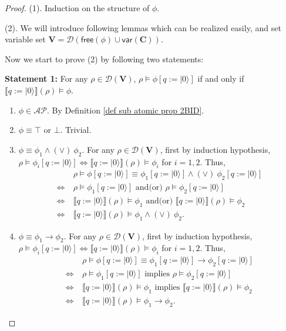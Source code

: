 \documentclass[conference,compsoc, 10pt]{IEEEtran}
\newcommand {\qI} {{q:=|0\rangle}}
\newcommand {\cD } {{\mathcal{D}}}
\newcommand {\free }[1] {{\mathsf{free}\left(#1\right)}}
\newcommand {\vars } {\mathbf{V}}
\newcommand {\var } {\mathsf{var}}
\newcommand {\prog } {{\mathbf{C}}}
\newcommand {\sem}[1] {\llbracket#1\rrbracket}
\newcommand {\AP} {{\mathcal{AP}}}
\begin{document}
\begin{appendices}
\begin{proof}
			\noindent (1). Induction on the structure of $\phi$.
			
			\vspace{0.2cm}
			
			\noindent (2). 	We will introduce following lemmas which can be realized easily, and set variable set $\vars = \cD(\free{\phi}\cup\var(\prog))$.	
			
			Now we start to prove (2) by following two statements:
			
			{\bf Statement 1:} For any $\rho\in\cD(\vars)$, $\rho\models\phi[\qI]$ if and only if $\sem{\qI}(\rho)\models\phi$.
			\begin{enumerate}
				\item $\phi\in\AP$. By Definition \ref{def sub atomic prop 2BID}.
				
				\item $\phi \equiv \top$ or $\bot$. Trivial.
				
				\item $\phi \equiv \phi_1\wedge\!(\vee)\ \phi_2$. For any $\rho\in\cD(\vars)$, first by induction hypothesis, $\rho\models\phi_i[\qI]\Leftrightarrow\sem{\qI}(\rho)\models\phi_i$ for $i = 1,2$. Thus, 
				\begin{align*}
				&\rho\models\phi[\qI] \equiv \phi_1[\qI]\wedge\!(\vee)\ \phi_2[\qI] \\
				\Longleftrightarrow\ &\rho\models\phi_1[\qI] \text{\ and(or)\ }\rho\models\phi_2[\qI] \\
				\Longleftrightarrow\ &\sem{\qI}(\rho)\models\phi_1 \text{\ and(or)\ }\sem{\qI}(\rho)\models\phi_2 \\
				\Longleftrightarrow\ &\sem{\qI}(\rho)\models\phi_1\wedge\!(\vee)\ \phi_2.
				\end{align*}
				
				\item $\phi \equiv \phi_1\rightarrow\phi_2$. For any $\rho\in\cD(\vars)$, first by induction hypothesis, $\rho\models\phi_i[\qI]\Leftrightarrow\sem{\qI}(\rho)\models\phi_i$ for $i = 1,2$. Thus, 
				\begin{align*}
				&\rho\models\phi[\qI] \equiv \phi_1[\qI]\rightarrow\phi_2[\qI] \\
				\Longleftrightarrow\ &\rho\models\phi_1[\qI] \text{\ implies\ }\rho\models\phi_2[\qI] \\
				\Longleftrightarrow\ &\sem{\qI}(\rho)\models\phi_1 \text{\ implies\ }\sem{\qI}(\rho)\models\phi_2 \\
				\Longleftrightarrow\ &\sem{\qI}(\rho)\models\phi_1\rightarrow\phi_2.
				\end{align*}
				

\end{enumerate}
\end{proof}
\end{appendices}
\end{document}
